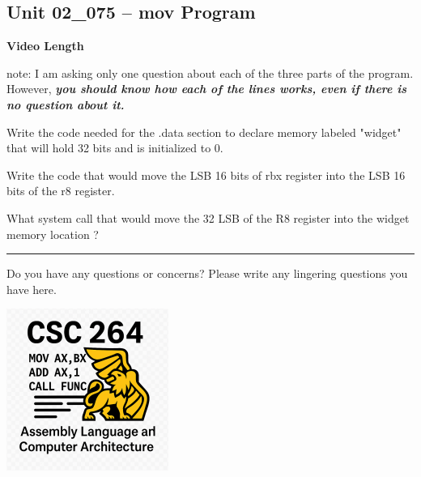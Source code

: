 \documentclass[letterpaper,12pt]{exam}
\newcommand{\unit}{Unit 02}
\begin{document}
\begin{questions}
\section*{\unit\_075 -- mov Program}
\par{\selectfont\textbf{Video Length }}
\par 
note: I am asking only one question about each of the three parts of the program.  However, \textbf{\textit{you should know how each of the lines works, even if there is no question about it.}}
\par 
\begin{samepage}
    \question Write the code needed for the .data section to declare memory labeled "widget" that will hold 32 bits and is initialized to 0.
    \vspace{5mm}
\end{samepage}
\begin{samepage}
    \question Write the code that would move the LSB 16 bits of rbx register into the LSB 16 bits of the r8 register.
    \vspace{5mm}
\end{samepage}
\par
 \begin{samepage}
     \question What system call that would move the 32 LSB of the R8 register into the widget memory location ?
     \vspace{5mm}
 \end{samepage}
 \par
  
\begin{center}
    \rule{0.5\textwidth}{.4pt}
\end{center}
Do you have any questions or concerns? Please write any lingering questions you have here.

\end{questions}
\vfill
\begin{center}
\includegraphics{../csc264Logo}
\end{center}
\end{document}
